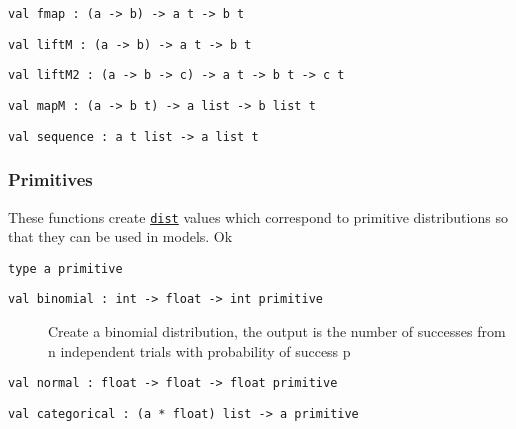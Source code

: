 \protect\hyperlink{val-fmap}{}\texttt{val\ fmap\ :\ (\textquotesingle{}a\ -\textgreater{}\ \textquotesingle{}b)\ -\textgreater{}\ \textquotesingle{}a\ t\ -\textgreater{}\ \textquotesingle{}b\ t}

\protect\hyperlink{val-liftM}{}\texttt{val\ liftM\ :\ (\textquotesingle{}a\ -\textgreater{}\ \textquotesingle{}b)\ -\textgreater{}\ \textquotesingle{}a\ t\ -\textgreater{}\ \textquotesingle{}b\ t}

\protect\hyperlink{val-liftM2}{}\texttt{val\ liftM2\ :\ (\textquotesingle{}a\ -\textgreater{}\ \textquotesingle{}b\ -\textgreater{}\ \textquotesingle{}c)\ -\textgreater{}\ \textquotesingle{}a\ t\ -\textgreater{}\ \textquotesingle{}b\ t\ -\textgreater{}\ \textquotesingle{}c\ t}

\protect\hyperlink{val-mapM}{}\texttt{val\ mapM\ :\ (\textquotesingle{}a\ -\textgreater{}\ \textquotesingle{}b\ t)\ -\textgreater{}\ \textquotesingle{}a\ list\ -\textgreater{}\ \textquotesingle{}b\ list\ t}

\protect\hyperlink{val-sequence}{}\texttt{val\ sequence\ :\ \textquotesingle{}a\ t\ list\ -\textgreater{}\ \textquotesingle{}a\ list\ t}

\hypertarget{distux5fprims}{\subsubsection{\texorpdfstring{\protect\hyperlink{distux5fprims}{}Primitives}{Primitives}}\label{distux5fprims}}

These functions create \href{index.html\#type-dist}{\texttt{dist}}
values which correspond to primitive distributions so that they can be
used in models. Ok

\protect\hyperlink{type-primitive}{}\texttt{type\ \textquotesingle{}a\ primitive}

\begin{description}
\item[{\protect\hyperlink{val-binomial}{}\texttt{val\ binomial\ :\ int\ -\textgreater{}\ float\ -\textgreater{}\ int\ primitive}}]
Create a binomial distribution, the output is the number of successes
from n independent trials with probability of success p
\end{description}

\protect\hyperlink{val-normal}{}\texttt{val\ normal\ :\ float\ -\textgreater{}\ float\ -\textgreater{}\ float\ primitive}

\protect\hyperlink{val-categorical}{}\texttt{val\ categorical\ :\ (\textquotesingle{}a\ *\ float)\ list\ -\textgreater{}\ \textquotesingle{}a\ primitive}

